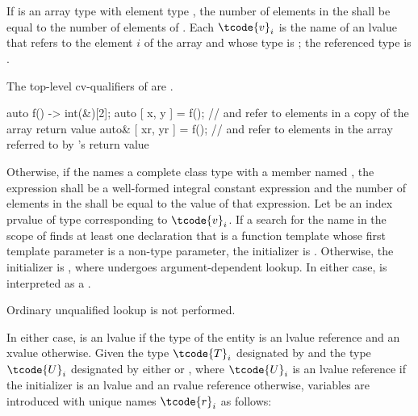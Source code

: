 \pnum
If  is an array type with element type , the number
of elements in the  shall be equal to the
number of elements of . Each $\tcode{v}_i$ is the name of an
lvalue that refers to the element $i$ of the array and whose type
is ; the referenced type is .
\begin{note}
The top-level cv-qualifiers of  are \cv.
\end{note}
\begin{example}
\begin{codeblock}
auto f() -> int(&)[2];
auto [ x, y ] = f();            //  and  refer to elements in a copy of the array return value
auto& [ xr, yr ] = f();         //  and  refer to elements in the array referred to by 's return value
\end{codeblock}
\end{example}

\pnum
Otherwise, if
the  
names a complete class type with a member named ,
the expression 
shall be a well-formed integral constant expression
and
the number of elements in
the  shall be equal to the value of that
expression.
Let  be an index prvalue of type 
corresponding to $\tcode{v}_i$.
If a search for the name 
in the scope of 
finds at least one declaration
that is a function template whose first template parameter
is a non-type parameter,
the initializer is
. Otherwise, the initializer is ,
where  undergoes argument-dependent lookup.
In either case,  is interpreted as a .
\begin{note}
Ordinary unqualified lookup is not performed.
\end{note}
In either case,  is an lvalue if the type of the entity 
is an lvalue reference and an xvalue otherwise.
Given the type $\tcode{T}_i$ designated by
 and
the type $\tcode{U}_i$ designated by
either  or ,
where $\tcode{U}_i$ is an lvalue reference if
the initializer is an lvalue and an rvalue reference otherwise,
variables are introduced with unique names $\tcode{r}_i$ as follows:

